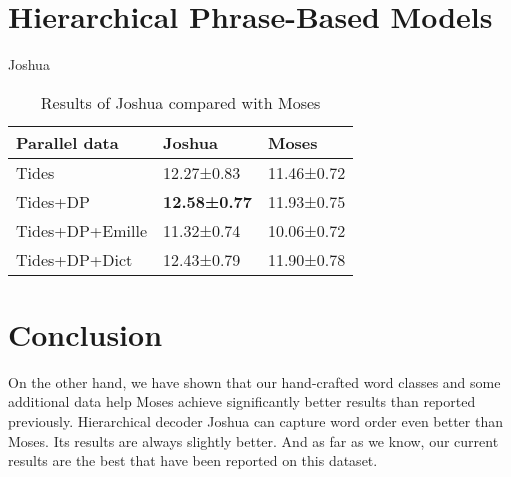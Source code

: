 \documentclass[11pt]{article}
\newcommand{\XXX}{\textcolor{red}{XXX }} %
\begin{document}
\section{Hierarchical Phrase-Based Models}
\label{joshua}

Joshua

\begin{table}[ht]
\begin{centering}
\begin{tabular}{l|l|l}
\textbf{Parallel data} & \textbf{Joshua} & \textbf{Moses} \\
\hline
Tides & 12.27±0.83 & 11.46±0.72\\
Tides+DP & \textbf{12.58±0.77} & 11.93±0.75\\
Tides+DP+Emille & 11.32±0.74 & 10.06±0.72\\
Tides+DP+Dict & 12.43±0.79 & 11.90±0.78\\
\end{tabular}
\caption{Results of Joshua compared with Moses}
\label{tab:joshua}
\end{centering}
\end{table}


\section{Conclusion}
\label{sec:concl}

On the other hand, we have shown that our hand-crafted word classes and some
additional data help Moses achieve significantly better results than reported
previously. Hierarchical decoder Joshua can capture word order even better than
Moses. Its results are always slightly better. And as far as we know, our
current results are the best that have been reported on this dataset.



\begin{small}

\end{small}
\end{document}
